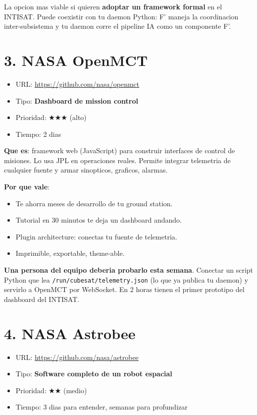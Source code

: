 \documentclass[11pt,a4paper,oneside]{report}
\begin{document}
\begin{nota}
La opcion mas viable si quieren \textbf{adoptar un framework formal} en
el INTISAT. Puede coexistir con tu daemon Python: F' maneja la coordinacion
inter-subsistema y tu daemon corre el pipeline IA como un componente F'.
\end{nota}

\section{3. NASA OpenMCT}

\begin{itemize}[leftmargin=1.5em]
  \item URL: \url{https://github.com/nasa/openmct}
  \item Tipo: \textbf{Dashboard de mission control}
  \item Prioridad: $\bigstar\bigstar\bigstar$ (alto)
  \item Tiempo: 2 dias
\end{itemize}

\textbf{Que es}: framework web (JavaScript) para construir interfaces de
control de misiones. Lo usa JPL en operaciones reales. Permite integrar
telemetria de cualquier fuente y armar sinopticos, graficos, alarmas.

\textbf{Por que vale}:
\begin{itemize}[leftmargin=2em]
  \item Te ahorra meses de desarrollo de tu ground station.
  \item Tutorial en 30 minutos te deja un dashboard andando.
  \item Plugin architecture: conectas tu fuente de telemetria.
  \item Imprimible, exportable, theme-able.
\end{itemize}

\begin{nota}
\textbf{Una persona del equipo deberia probarlo esta semana}. Conectar
un script Python que lea \texttt{/run/cubesat/telemetry.json} (lo que ya
publica tu daemon) y servirlo a OpenMCT por WebSocket. En 2 horas tienen
el primer prototipo del dashboard del INTISAT.
\end{nota}

\section{4. NASA Astrobee}

\begin{itemize}[leftmargin=1.5em]
  \item URL: \url{https://github.com/nasa/astrobee}
  \item Tipo: \textbf{Software completo de un robot espacial}
  \item Prioridad: $\bigstar\bigstar$ (medio)
  \item Tiempo: 3 dias para entender, semanas para profundizar
\end{itemize}
\end{document}
